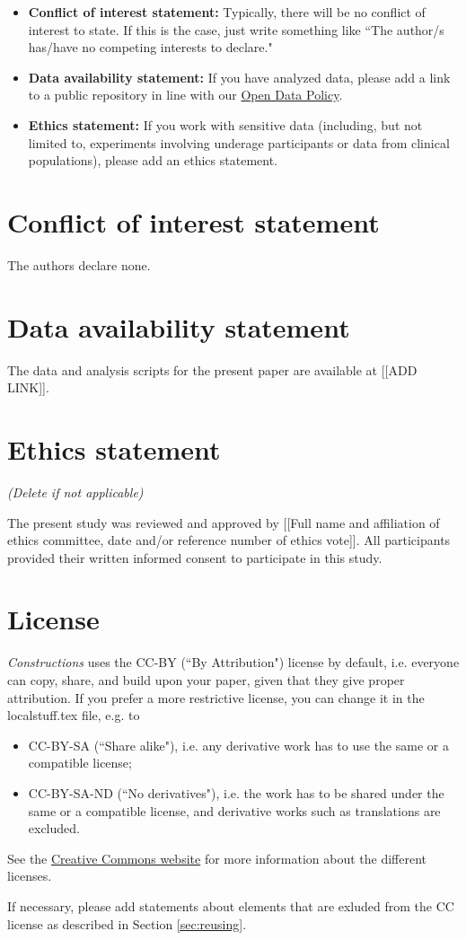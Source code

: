 \begin{itemize}
    \item \textbf{Conflict of interest statement:} Typically, there will be no conflict of interest to state. If this is the case, just write something like ``The author/s has/have no competing interests to declare."
    \item \textbf{Data availability statement:} If you have analyzed data, please add a link to a public repository in line with our \href{https://constructions.journals.hhu.de/about}{Open Data Policy}. 
    \item \textbf{Ethics statement:} If you work with sensitive data (including, but not limited to, experiments involving underage participants or data from clinical populations), please add an ethics statement. 

    
\end{itemize}

\section*{Conflict of interest statement}

The authors declare none. %

\section*{Data availability statement}

The data and analysis scripts for the present paper are available at [[ADD LINK]].

\section*{Ethics statement}
\textit{(Delete if not applicable)}

\noindent The present study was reviewed and approved by [[Full name and affiliation of ethics committee, date and/or reference number of ethics vote]]. All participants provided their written informed consent to participate in this study.

\section*{License}
\doclicenseIcon \doclicenseText

\noindent \textit{Constructions} uses the CC-BY (``By Attribution") license by default, i.e. everyone can copy, share, and build upon your paper, given that they give proper attribution. If you prefer a more restrictive license, you can change it in the localstuff.tex file, e.g. to
\begin{itemize}
    \item CC-BY-SA (``Share alike"), i.e. any derivative work has to use the same or a compatible license;
    \item CC-BY-SA-ND (``No derivatives"), i.e. the work has to be shared under the same or a compatible license, and derivative works such as translations are excluded.
\end{itemize}

\noindent See the \href{https://creativecommons.org/}{Creative Commons website} for more information about the different licenses.

If necessary, please add statements about elements that are exluded from the CC license as described in Section \ref{sec:reusing}.




